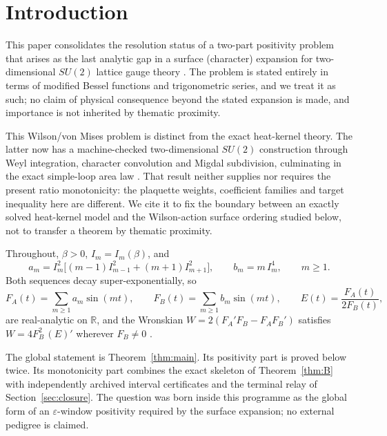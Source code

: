 \documentclass[11pt]{article}
\theoremstyle{remark}
\newcommand{\FA}{F_{\!A}}
\newcommand{\FB}{F_{\!B}}
\begin{document}
\section{Introduction}

This paper consolidates the resolution status of a two-part positivity
problem that arises as the last analytic gap in a surface (character)
expansion for two-dimensional $SU(2)$ lattice gauge theory
\cite{Companion,PhiLemma,WronskianNote}. The problem is stated entirely in
terms of modified Bessel functions and trigonometric series, and we treat
it as such; no claim of physical consequence beyond the stated expansion
is made, and importance is not inherited by thematic proximity.

This Wilson/von Mises problem is distinct from the exact heat-kernel
theory.  The latter now has a machine-checked two-dimensional $SU(2)$
construction through Weyl integration, character convolution and Migdal
subdivision, culminating in the exact simple-loop area law
\cite{MigdalLean}.  That result neither supplies nor requires the present
ratio monotonicity: the plaquette weights, coefficient families and target
inequality here are different.  We cite it to fix the boundary between an
exactly solved heat-kernel model and the Wilson-action surface ordering
studied below, not to transfer a theorem by thematic proximity.

Throughout, $\beta>0$, $I_m=I_m(\beta)$, and
\begin{equation}\label{eq:coeffs}
a_m = I_m^2\bigl[(m-1)I_{m-1}^2+(m+1)I_{m+1}^2\bigr],\qquad
b_m = m\,I_m^4,\qquad m\ge1 .
\end{equation}
Both sequences decay super-exponentially, so
\begin{equation}\label{eq:FAFB}
\FA(t)=\sum_{m\ge1}a_m\sin(mt),\qquad
\FB(t)=\sum_{m\ge1}b_m\sin(mt),\qquad
E(t)=\frac{\FA(t)}{2\FB(t)},
\end{equation}
are real-analytic on $\mathbb{R}$, and the Wronskian
$W=2(\FA'\FB-\FA\FB')$ satisfies $W=4\FB^2\,(E)'$ wherever $\FB\neq0$
\cite{WronskianNote}.

The global statement is Theorem~\ref{thm:main}.  Its positivity part is
proved below twice.  Its monotonicity part combines the exact skeleton of
Theorem~\ref{thm:B} with independently archived interval certificates and
the terminal relay of Section~\ref{sec:closure}.  The question was born
inside this programme as the global form of an $\varepsilon$-window
positivity required by the surface expansion; no external pedigree is
claimed.
\end{document}
